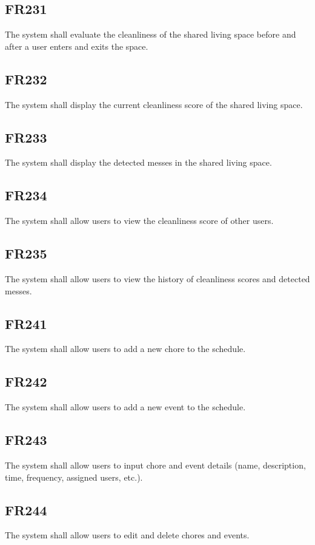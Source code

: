 \documentclass[12pt, titlepage]{article}
\begin{document}
\subsection{FR231}
The system shall evaluate the cleanliness of the shared living space before and after a user enters and exits the space.

\subsection{FR232}

The system shall display the current cleanliness score of the shared living space.
\subsection{FR233}

The system shall display the detected messes in the shared living space.
\subsection{FR234}

The system shall allow users to view the cleanliness score of other users.

\subsection{FR235}
The system shall allow users to view the history of cleanliness scores and detected messes.

\subsection{FR241}
The system shall allow users to add a new chore to the schedule.

\subsection{FR242}
The system shall allow users to add a new event to the schedule.

\subsection{FR243}
The system shall allow users to input chore and event details (name, description, time, frequency, assigned users, etc.).

\subsection{FR244}
The system shall allow users to edit and delete chores and events.
\end{document}
